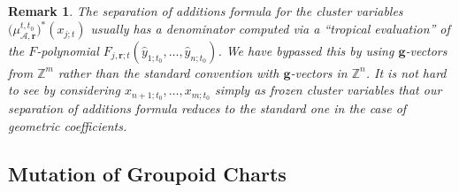 \documentclass{amsart}
\newtheorem{remark}[theorem]{Remark}
\numberwithin{equation}{section}
\newcommand{\bfg}{\mathbf{g}}
\newcommand{\bfr}{{\boldsymbol{r}}}
\newcommand{\cA}{\mathcal{A}}
\newcommand{\ZZ}{\mathbb{Z}}
\begin{document}
\begin{remark}
  The separation of additions formula for the cluster variables $\big(\mu_{\cA,\bfr}^{t,t_0}\big)^*(x_{j;t})$ usually has a denominator computed via a ``tropical evaluation'' of the $F$-polynomial $F_{j,\bfr;t}(\hat y_{1;t_0},\ldots,\hat y_{n;t_0})$.
  We have bypassed this by using $\bfg$-vectors from $\ZZ^m$ rather than the standard convention with $\bfg$-vectors in $\ZZ^n$.
  It is not hard to see by considering $x_{n+1;t_0}, \ldots, x_{m;t_0}$ simply as frozen cluster variables that our separation of additions formula reduces to the standard one in the case of geometric coefficients.
\end{remark}


\subsection{Mutation of Groupoid Charts}
\label{sec:groupoid mutations}
\end{document}
